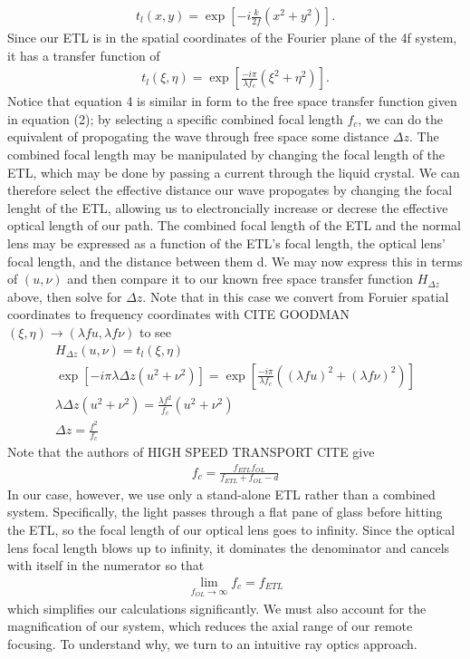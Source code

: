 \begin{gather}
	t_l(x,y) =\exp \left[ - i \frac{k}{2f}\left(x^2 + y^2\right)\right] .
\end{gather}
Since our ETL is in the spatial coordinates of the Fourier plane of the 4f system, it has a transfer function of
\begin{gather}
	t_l(\xi, \eta) = \exp\left[ \frac{-i \pi}{\lambda f_c}\left(\xi^2 + \eta^2\right)\right].
\end{gather}
Notice that equation 4 is similar in form to the free space transfer function given in equation (2); by selecting a specific combined focal length $f_c$, we can do the equivalent of propogating the wave through free space some distance $\Delta z$. The combined focal length may be manipulated by changing the focal length of the ETL, which may be done by passing a current through the liquid crystal. We can therefore select the effective distance our wave propogates by changing the focal lenght of the ETL, allowing us to electroncially increase or decrese the effective optical length of our path. The combined focal length of the ETL and the normal lens may be expressed as a function of the ETL's focal length, the optical lens' focal length, and the distance between them d. We may now express this in terms of $(u, \nu)$ and then compare it to our known free space transfer function $H_{\Delta z}$ above, then solve for $\Delta z$. Note that in this case we convert from Foruier spatial coordinates to frequency coordinates with {CITE GOODMAN} $ (\xi, \eta) \to (\lambda f u, \lambda f \nu)$ to see 
\begin{gather} 
		H_{\Delta z}(u,\nu)=t_l(\xi, \eta) \\
		 \exp\left[-i \pi \lambda \Delta z (u^2 + \nu^2)\right] = \exp\left[ \frac{-i \pi}{\lambda f_c}\left((\lambda f u)^2 + (\lambda f \nu)^2\right)\right]\\
		\lambda \Delta z (u^2 + \nu^2) = \frac{\lambda f^2}{f_c}(u^2+\nu^2)\\
		\Delta z = \frac{f^2}{f_c}
\end{gather}
Note that the authors of {HIGH SPEED TRANSPORT CITE} give
\begin{gather}
	f_c = \frac{f_{ETL}f_{OL}}{f_{ETL}+f_{OL}-d}
\end{gather}
In our case, however, we use only a stand-alone ETL rather than a combined system. Specifically, the light passes through a flat pane of glass before hitting the ETL, so the focal length of our optical lens goes to infinity. Since the optical lens focal length blows up to infinity, it dominates the denominator and cancels with itself in the numerator so that
\begin{gather}
	 \lim_{f_{OL} \to \infty} f_c = f_{ETL}
\end{gather}
which simplifies our calculations significantly. We must also account for the magnification of our system, which reduces the axial range of our remote focusing. To understand why, we turn to an intuitive ray optics approach.

